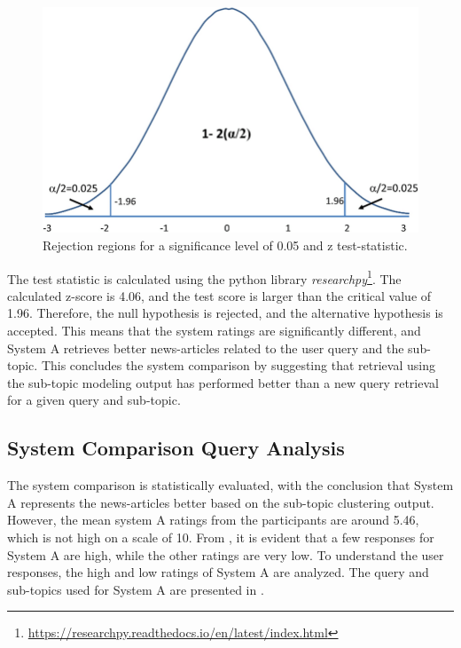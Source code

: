 \begin{figure}[h]
	\centering
	\includegraphics[width=.75\textwidth]{images/outside/z_score.PNG}
	\caption[Rejection regions for z test-statistic.]{Rejection regions for a significance level of 0.05 and z test-statistic. \cite{article} \label{fig:z_score}}
\end{figure}



The test statistic is calculated using the python library \textit{researchpy}\footnote{\url{https://researchpy.readthedocs.io/en/latest/index.html}}. The calculated z-score is 4.06, and the test score is larger than the critical value of 1.96. Therefore, the null hypothesis is rejected, and the alternative hypothesis is accepted. This means that the system ratings are significantly different, and System A retrieves better news-articles related to the user query and the sub-topic. This concludes the system comparison by suggesting that retrieval using the sub-topic modeling output has performed better than a new query retrieval for a given query and sub-topic.

\subsection{System Comparison Query Analysis}

The system comparison is statistically evaluated, with the conclusion that System A represents the news-articles better based on the sub-topic clustering output. However, the mean system A ratings from the participants are around 5.46, which is not high on a scale of 10. From , it is evident that a few responses for System A are high, while the other ratings are very low. To understand the user responses, the high and low ratings of System A are analyzed. The query and sub-topics used for System A are presented in .

